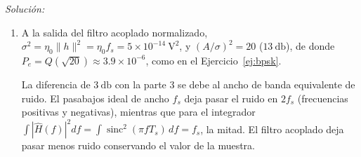 \documentclass[a4paper,11pt]{article}
\DeclareMathOperator{\sinc}{sinc}
\newenvironment{solucion}[1][]{
\noindent \large \textsl{Solución:} \ifthenelse{\equal{#1}{}}{}{\emph{(#1)}}

\smallskip
}{
\bigskip
}
\begin{document}
\begin{solucion}
\begin{enumerate}
A cambio, se transmiten $2$ bits por símbolo en el mismo ancho de banda. Como cada rama es un BPSK con la misma amplitud y el mismo ruido, la probabilidad de error de bit es la misma que en BPSK, con el doble de tasa (y el doble de potencia, es decir la misma energía por bit). BPSK desperdicia la dimensión en cuadratura; $4$-QAM la usa.
\item A la salida del filtro acoplado normalizado, $\sigma^2=\eta_0\|h\|^2=\eta_0f_s=5\times10^{-14}\ \unit{\square\volt}$, y $(A/\sigma)^2=20$ ($13\ \unit{\decibel}$), de donde $P_e=Q(\sqrt{20})\approx3.9\times10^{-6}$, como en el Ejercicio~\ref{ej:bpsk}.

La diferencia de $3\ \unit{\decibel}$ con la parte 3 se debe al ancho de banda equivalente de ruido. El pasabajos ideal de ancho $f_s$ deja pasar el ruido en $2f_s$ (frecuencias positivas y negativas), mientras que para el integrador $\int|\hat H(f)|^2df=\int\sinc^2(\pi fT_s)\,df=f_s$, la mitad. El filtro acoplado deja pasar menos ruido conservando el valor de la muestra.
\end{enumerate}
\end{solucion}
\end{document}
